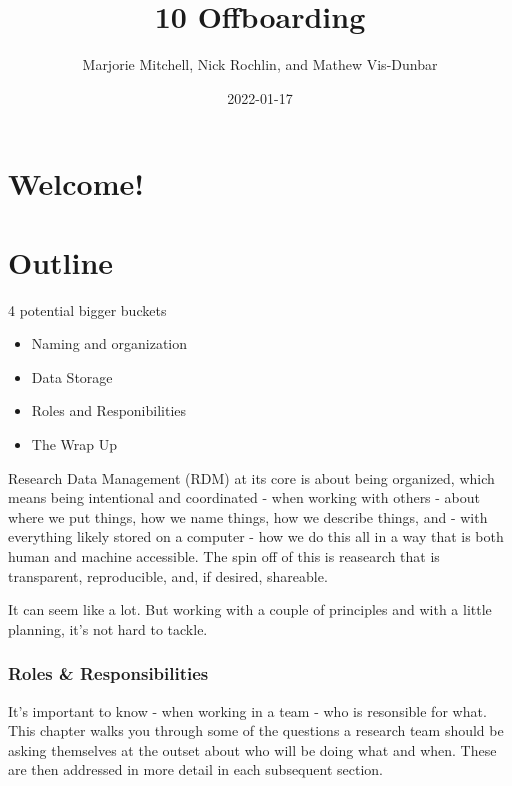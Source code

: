 \documentclass[
]{book}
\title{10 Offboarding}
\author{Marjorie Mitchell, Nick Rochlin, and Mathew Vis-Dunbar}
\date{2022-01-17}
\providecommand{\tightlist}{%
  \setlength{\itemsep}{0pt}\setlength{\parskip}{0pt}}
\begin{document}
\maketitle

{
\setcounter{tocdepth}{1}
\tableofcontents
}
\hypertarget{welcome}{%
\chapter*{Welcome!}\label{welcome}}

\hypertarget{outline}{%
\chapter*{Outline}\label{outline}}

4 potential bigger buckets

\begin{itemize}
\tightlist
\item
  Naming and organization
\item
  Data Storage
\item
  Roles and Responibilities
\item
  The Wrap Up
\end{itemize}

Research Data Management (RDM) at its core is about being organized, which means being intentional and coordinated - when working with others - about where we put things, how we name things, how we describe things, and - with everything likely stored on a computer - how we do this all in a way that is both human and machine accessible. The spin off of this is reasearch that is transparent, reproducible, and, if desired, shareable.

It can seem like a lot. But working with a couple of principles and with a little planning, it's not hard to tackle.

\hypertarget{roles-responsibilities}{%
\subsection*{Roles \& Responsibilities}\label{roles-responsibilities}}

It's important to know - when working in a team - who is resonsible for what. This chapter walks you through some of the questions a research team should be asking themselves at the outset about who will be doing what and when. These are then addressed in more detail in each subsequent section.
\end{document}
